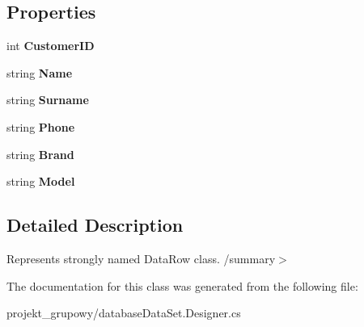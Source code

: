\subsection*{Properties}
\begin{DoxyCompactItemize}
\item 
\mbox{\label{classprojekt__grupowy_1_1database_data_set_1_1_table_row_acca10b3fee85160e8b31dd4831b2e4aa}} 
int {\bfseries Customer\+ID}
\item 
\mbox{\label{classprojekt__grupowy_1_1database_data_set_1_1_table_row_a580e3324a8bf4643dd118da776260521}} 
string {\bfseries Name}
\item 
\mbox{\label{classprojekt__grupowy_1_1database_data_set_1_1_table_row_a8e5f9e1d022e0c91568c8bdbd68de382}} 
string {\bfseries Surname}
\item 
\mbox{\label{classprojekt__grupowy_1_1database_data_set_1_1_table_row_af2371ee7c8b41e1c4b8caa0132e5dcb1}} 
string {\bfseries Phone}
\item 
\mbox{\label{classprojekt__grupowy_1_1database_data_set_1_1_table_row_a08480943e30e3a4f08c2dba3a78d6521}} 
string {\bfseries Brand}
\item 
\mbox{\label{classprojekt__grupowy_1_1database_data_set_1_1_table_row_a5c0b46e9528d671dd0387d1a394a8f54}} 
string {\bfseries Model}
\end{DoxyCompactItemize}


\subsection{Detailed Description}
Represents strongly named Data\+Row class. /summary$>$ 

The documentation for this class was generated from the following file\+:\begin{DoxyCompactItemize}
\item 
projekt\+\_\+grupowy/database\+Data\+Set.\+Designer.\+cs\end{DoxyCompactItemize}
